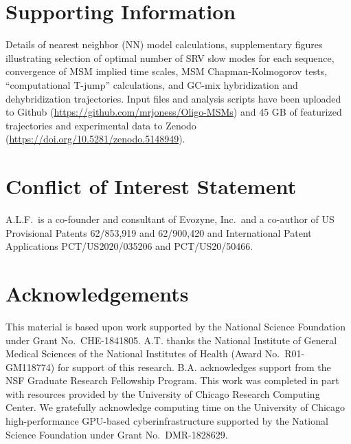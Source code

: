 \documentclass[journal=jpcbfk,manuscript=article]{achemso}
\newcommand*{\rood}[1]{{#1}}
\begin{document}
\section*{Supporting Information}

Details of nearest neighbor (NN) model calculations, supplementary figures illustrating selection of optimal number of SRV slow modes for each sequence, convergence of MSM implied time scales, MSM Chapman-Kolmogorov tests, ``computational T-jump'' calculations, and GC-mix hybridization and dehybridization trajectories. \rood{Input files and analysis scripts have been uploaded to Github (\url{https://github.com/mrjoness/Oligo-MSMs}) and 45 GB of featurized trajectories and experimental data to Zenodo (\url{https://doi.org/10.5281/zenodo.5148949}).} 


\section*{Conflict of Interest Statement}

A.L.F.\ is a co-founder and consultant of Evozyne, Inc.\ and a co-author of US Provisional Patents 62/853,919 and 62/900,420 and International Patent Applications PCT/US2020/035206 and PCT/US20/50466.


\section*{Acknowledgements}

This material is based upon work supported by the National Science Foundation under Grant No.\ CHE-1841805. A.T. thanks the National Institute of General Medical Sciences of the National Institutes of Health (Award No.\ R01-GM118774) for support of this research. B.A. acknowledges support from the NSF Graduate Research Fellowship Program. This work was completed in part with resources provided by the University of Chicago Research Computing Center. We gratefully acknowledge computing time on the University of Chicago high-performance GPU-based cyberinfrastructure supported by the National Science Foundation under Grant No.\ DMR-1828629.


\clearpage
\newpage

%



\end{document}
